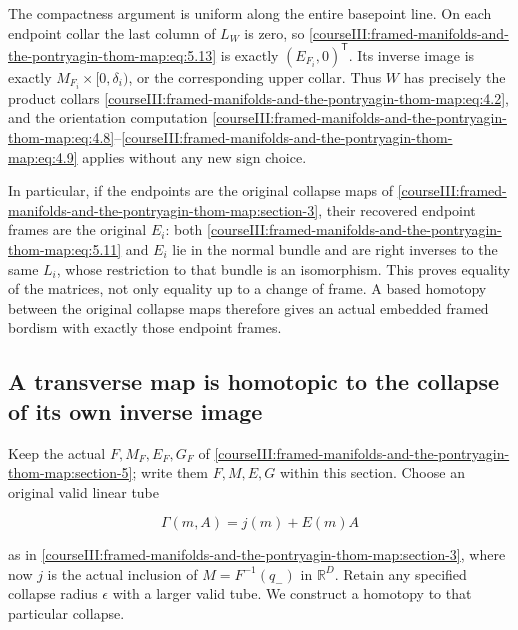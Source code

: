 The compactness argument is uniform along the entire basepoint line. On each endpoint collar the last column of \(L_W\) is zero, so \eqref{courseIII:framed-manifolds-and-the-pontryagin-thom-map:eq:5.13} is exactly \((E_{F_i},0)^{\mathsf T}\). Its inverse image is exactly \(M_{F_i}\times[0,\delta_i)\), or the corresponding upper collar. Thus \(W\) has precisely the product collars \eqref{courseIII:framed-manifolds-and-the-pontryagin-thom-map:eq:4.2}, and the orientation computation \eqref{courseIII:framed-manifolds-and-the-pontryagin-thom-map:eq:4.8}--\eqref{courseIII:framed-manifolds-and-the-pontryagin-thom-map:eq:4.9} applies without any new sign choice.

In particular, if the endpoints are the original collapse maps of \cref{courseIII:framed-manifolds-and-the-pontryagin-thom-map:section-3}, their recovered endpoint frames are the original \(E_i\): both \eqref{courseIII:framed-manifolds-and-the-pontryagin-thom-map:eq:5.11} and \(E_i\) lie in the normal bundle and are right inverses to the same \(L_i\), whose restriction to that bundle is an isomorphism. This proves equality of the matrices, not only equality up to a change of frame. A based homotopy between the original collapse maps therefore gives an actual embedded framed bordism with exactly those endpoint frames.

\label{courseIII:framed-manifolds-and-the-pontryagin-thom-map:pt-inverse-tube-comparison}

\subsection{A transverse map is homotopic to the collapse of its own inverse image}
\label{courseIII:framed-manifolds-and-the-pontryagin-thom-map:section-6}

\label{courseIII:pontryagin-thom:6}

Keep the actual \(F,M_F,E_F,G_F\) of \cref{courseIII:framed-manifolds-and-the-pontryagin-thom-map:section-5}; write them \(F,M,E,G\) within this section. Choose an original valid linear tube

\begin{equation}
\Gamma(m,A)=j(m)+E(m)A
 \label{courseIII:framed-manifolds-and-the-pontryagin-thom-map:eq:6.1}
\end{equation}

as in \cref{courseIII:framed-manifolds-and-the-pontryagin-thom-map:section-3}, where now \(j\) is the actual inclusion of \(M=F^{-1}(q_-)\) in \(\mathbb R^D\). Retain any specified collapse radius \(\epsilon\) with a larger valid tube. We construct a homotopy to that particular collapse.

